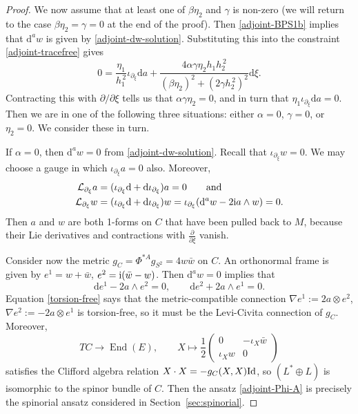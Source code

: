 \documentclass[10pt,a4paper]{amsart}
\newcommand{\1}{{\mathbb{1}}}
\newcommand{\lto}{\longrightarrow}
\def \d{\mathrm{d}}
\numberwithin{equation}{section}
\begin{document}
\begin{proof}
We now assume that at least one of $\beta\eta_2$ and $\gamma$ is non-zero (we will return to the case $\beta\eta_2=\gamma=0$ at the end of the proof). Then \eqref{adjoint-BPS1b} implies that $\d^aw$ is given by \eqref{adjoint-dw-solution}. Substituting this into the constraint \eqref{adjoint-tracefree} gives
\begin{equation*}
0 = \frac{\eta_1}{h_1^{\,2}}\iota_{\partial_\xi}\d a + \frac{4\alpha\gamma\eta_2 h_1h_2^{\,2}}{(\beta\eta_2)^2+(2\gamma h_2^{\,2})^2}\d\xi.
\end{equation*}
Contracting this with $\partial/\partial\xi$ tells us that $\alpha\gamma\eta_2=0$, and in turn that $\eta_1\iota_{\partial_\xi}\d a=0$. Then we are in one of the following three situations: either $\alpha=0$, $\gamma=0$, or $\eta_2=0$. We consider these in turn.

If $\alpha=0$, then $\d^a w=0$ from \eqref{adjoint-dw-solution}. Recall that $\iota_{\partial_\xi}w=0$. We may choose a gauge in which $\iota_{\partial_\xi}a=0$ also. Moreover,
\begin{equation*}
\begin{aligned}
\mathcal{L}_{\partial_\xi}a &= (\iota_{\partial_\xi}\d + \d\iota_{\partial_\xi})a=0 \qquad\text{and}\\
\mathcal{L}_{\partial_\xi}w &= (\iota_{\partial_\xi}\d + \d\iota_{\partial_\xi})w=\iota_{\partial_\xi}(\d^aw-2{\rm i}a\wedge w)=0.
\end{aligned}
\end{equation*}
Then $a$ and $w$ are both 1-forms on $C$ that have been pulled back to $M$, because their Lie derivatives and contractions with $\frac{\partial}{\partial \xi}$ vanish.

Consider now the metric $g_C=\Phi^{\ast A}g_{S^2}=4w\bar{w}$ on $C$. An orthonormal frame is given by $e^1=w+\bar{w}$, $e^2={\rm i}(\bar{w}-w)$. Then $\d^aw=0$ implies that
\begin{equation}
\label{torsion-free}
\d e^1 -2a\wedge e^2=0,\qquad \d e^2 +2a\wedge e^1=0.
\end{equation}
Equation \eqref{torsion-free} says that the metric-compatible connection $\nabla e^1:=2a\otimes e^2$, $\nabla e^2:=-2a\otimes e^1$ is torsion-free, so it must be the Levi-Civita connection of $g_C$. Moreover,
\begin{equation*}
TC\lto \operatorname{End}(E), \qquad X\mapsto \frac12\begin{pmatrix}0&-\iota_X\bar{w}\\ \iota_X w&0\end{pmatrix}
\end{equation*}
satisfies the Clifford algebra relation $X\cdot X=-g_C(X,X){\rm Id}$, so $(L^\ast\oplus L)$ is isomorphic to the spinor bundle of $C$. Then the ansatz \eqref{adjoint-Phi-A} is precisely the spinorial ansatz considered in Section~\ref{sec:spinorial}.


\end{proof}
\end{document}

